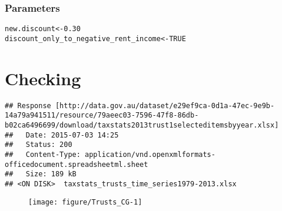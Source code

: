 \documentclass{grattan}\usepackage[]{graphicx}\usepackage[]{color}
\makeatletter
\newcommand{\hlnum}[1]{\textcolor[rgb]{0.686,0.059,0.569}{#1}}%
\newcommand{\hlstd}[1]{\textcolor[rgb]{0.345,0.345,0.345}{#1}}%
\newcommand{\hlkwb}[1]{\textcolor[rgb]{0.69,0.353,0.396}{#1}}%
\newenvironment{kframe}{%
 \def\at@end@of@kframe{}%
 \ifinner\ifhmode%
  \def\at@end@of@kframe{\end{minipage}}%
  \begin{minipage}{\columnwidth}%
 \fi\fi%
 \def\FrameCommand##1{\hskip\@totalleftmargin \hskip-\fboxsep
 \colorbox{shadecolor}{##1}\hskip-\fboxsep
     \hskip-\linewidth \hskip-\@totalleftmargin \hskip\columnwidth}%
 \MakeFramed {\advance\hsize-\width
   \@totalleftmargin\z@ \linewidth\hsize
   \@setminipage}}%
 {\par\unskip\endMakeFramed%
 \at@end@of@kframe}
\newenvironment{knitrout}{}{} %
\makeatother
\begin{document}
\subsection{Parameters}
\begin{knitrout}
\color{fgcolor}\begin{kframe}
\begin{alltt}
\hlstd{new.discount} \hlkwb{<-} \hlnum{0.30}
\hlstd{discount_only_to_negative_rent_income} \hlkwb{<-} \hlnum{TRUE}
\end{alltt}
\end{kframe}
\end{knitrout}




\begin{knitrout}
\color{fgcolor}\begin{kframe}


{\ttfamily\noindent\bfseries\color{errorcolor}{\#\# Error in `[.data.table`(`\_dt`, , list(mean.tx.i = mean(new\_Taxable\_Income)), : object 'new\_Taxable\_Income' not found}}

{\ttfamily\noindent\bfseries{}}\end{kframe}
\end{knitrout}
\chapter{Checking}


\begin{knitrout}
\color{fgcolor}\begin{kframe}
\begin{verbatim}
## Response [http://data.gov.au/dataset/e29ef9ca-0d1a-47ec-9e9b-14a79a941511/resource/79aeec03-7596-47f8-86db-b02ca6496699/download/taxstats2013trust1selecteditemsbyyear.xlsx]
##   Date: 2015-07-03 14:25
##   Status: 200
##   Content-Type: application/vnd.openxmlformats-officedocument.spreadsheetml.sheet
##   Size: 189 kB
## <ON DISK>  taxstats_trusts_time_series1979-2013.xlsx
\end{verbatim}
\end{kframe}
\end{knitrout}


\begin{figure}
\texttt{[image: figure/Trusts\_CG-1]}
\notes{}

\end{figure}
\end{document}
